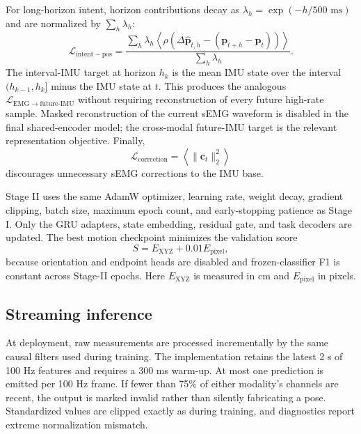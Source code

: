 For long-horizon intent, horizon contributions decay as
$\lambda_h=\exp(-h/500\text{ ms})$ and are normalized by
$\sum_h\lambda_h$:
\begin{equation}
 \mathcal{L}_{\mathrm{intent-pos}}
 = \frac{\sum_h\lambda_h
  \left\langle\rho(\Delta\hat{\mathbf{p}}_{t,h}
  -(\mathbf{p}_{t+h}-\mathbf{p}_t))\right\rangle}
 {\sum_h\lambda_h}.
\end{equation}
The interval-IMU target at horizon $h_k$ is the mean IMU state over the interval
$(h_{k-1},h_k]$ minus the IMU state at $t$.  This produces the analogous
$\mathcal{L}_{\mathrm{EMG\rightarrow future\text{-}IMU}}$ without requiring
reconstruction of every future high-rate sample.  Masked reconstruction of the
current sEMG waveform is disabled in the final shared-encoder model; the
cross-modal future-IMU target is the relevant representation objective.
Finally,
\begin{equation}
 \mathcal{L}_{\mathrm{correction}}
 = \left\langle\|\mathbf{c}_t\|_2^2\right\rangle
\end{equation}
discourages unnecessary sEMG corrections to the IMU base.

Stage II uses the same AdamW optimizer, learning rate, weight decay, gradient
clipping, batch size, maximum epoch count, and early-stopping patience as Stage
I.  Only the GRU adapters, state embedding, residual gate, and task decoders are
updated.  The best motion checkpoint minimizes the validation score
\begin{equation}
 S = E_{\mathrm{XYZ}} + 0.01E_{\mathrm{pixel}},
\end{equation}
because orientation and endpoint heads are disabled and frozen-classifier F1
is constant across Stage-II epochs.  Here $E_{\mathrm{XYZ}}$ is measured in cm
and $E_{\mathrm{pixel}}$ in pixels.

\subsection{Streaming inference}

At deployment, raw measurements are processed incrementally by the same causal
filters used during training.  The implementation retains the latest 2 s of
100 Hz features and requires a 300 ms warm-up.  At most one prediction is
emitted per 100 Hz frame.  If fewer than 75\% of either modality's channels are
recent, the output is marked invalid rather than silently fabricating a pose.
Standardized values are clipped exactly as during training, and diagnostics
report extreme normalization mismatch.

